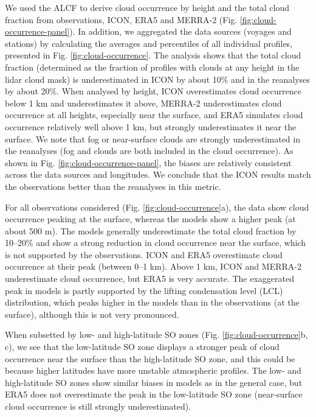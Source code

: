 \documentclass[12pt,a4paper]{article}
\begin{document}
We used the ALCF to derive cloud occurrence by height and the total cloud
fraction from observations, ICON, ERA5 and MERRA-2 (Fig.
\ref{fig:cloud-occurrence-panel}). In addition, we aggregated the data sources
(voyages and stations) by calculating the averages and percentiles of all
individual profiles, presented in Fig. \ref{fig:cloud-occurrence}. The analysis
shows that the total cloud fraction (determined as the fraction of profiles
with clouds at any height in the lidar cloud mask) is underestimated in ICON
by about 10\% and in the reanalyses by about 20\%. When analysed by
height, ICON overestimates cloud occurrence below 1 km and underestimates it
above, MERRA-2 underestimates cloud occurrence at all heights, especially near
the surface, and ERA5 simulates cloud occurrence relatively well above 1 km,
but strongly underestimates it near the surface.  We note that fog or
near-surface clouds are strongly underestimated in the reanalyses (fog and clouds are
both included in the cloud occurrence).  As shown in Fig.
\ref{fig:cloud-occurrence-panel}, the biases are relatively consistent across
the data sources and longitudes. We conclude that the ICON results match the observations better than the reanalyses in this metric.

For all observations considered (Fig. \ref{fig:cloud-occurrence}a), the data show
cloud occurrence peaking at the surface, whereas the models show a higher peak (at
about 500 m). The models generally underestimate the total cloud fraction by 10--20\% and show a strong reduction in cloud occurrence near the surface, which is not
supported by the observations. ICON and ERA5 overestimate cloud occurrence at
their peak (between 0--1 km). Above 1 km, ICON and MERRA-2 underestimate cloud
occurrence, but ERA5 is very accurate. The exaggerated peak in models is partly
supported by the lifting condensation level (LCL) distribution, which peaks
higher in the models than in the observations (at the surface), although this
is not very pronounced.

When subsetted by low- and high-latitude SO zones (Fig.
\ref{fig:cloud-occurrence}b, c), we see that the low-latitude SO zone displays
a stronger peak of cloud occurrence near the surface than the high-latitude SO
zone, and this could be because higher latitudes have more unstable atmospheric
profiles. The low- and high-latitude SO zones show similar biases in models as
in the general case, but ERA5 does not overestimate the peak in the
low-latitude SO zone (near-surface cloud occurrence is still strongly
underestimated).
\end{document}
